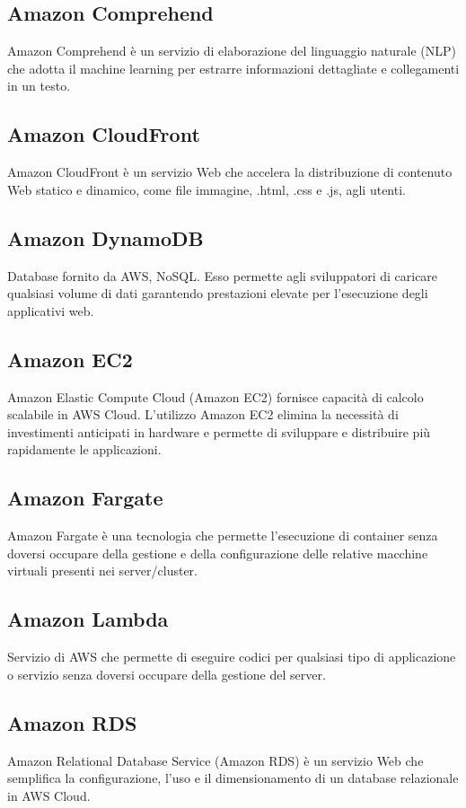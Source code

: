 \documentclass{classes/base}
\begin{document}
        \subsection*{Amazon Comprehend}
        Amazon Comprehend è un servizio di elaborazione del linguaggio naturale (NLP) che adotta il machine learning per estrarre informazioni dettagliate e collegamenti in un testo.
        
        \subsection*{Amazon CloudFront}
        Amazon CloudFront è un servizio Web che accelera la distribuzione di contenuto Web statico e dinamico, come file immagine, .html, .css e .js, agli utenti.

        \subsection*{Amazon DynamoDB}
        Database fornito da AWS, NoSQL. Esso permette agli sviluppatori di caricare qualsiasi volume di dati garantendo prestazioni elevate per l'esecuzione degli applicativi web.

        \subsection*{Amazon EC2}
        Amazon Elastic Compute Cloud (Amazon EC2) fornisce capacità di calcolo scalabile in AWS Cloud. L'utilizzo Amazon EC2 elimina la necessità di investimenti anticipati in hardware e permette di sviluppare e distribuire più rapidamente le applicazioni.

        \subsection*{Amazon Fargate}
        Amazon Fargate è una tecnologia che permette l'esecuzione di container senza doversi occupare della gestione e della configurazione delle relative macchine virtuali presenti nei server/cluster. 

        \subsection*{Amazon Lambda}
        Servizio di AWS che permette di eseguire codici per qualsiasi tipo di applicazione o servizio senza doversi occupare della gestione del server.

        \subsection*{Amazon RDS}
        Amazon Relational Database Service (Amazon RDS) è un servizio Web che semplifica la configurazione, l'uso e il dimensionamento di un database relazionale in AWS Cloud.
\end{document}
